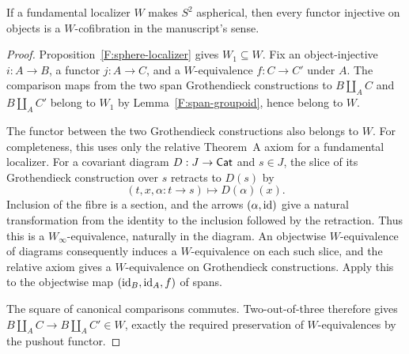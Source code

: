 \begin{theorem}\label{F:sphere-cofibrations}
If a fundamental localizer $W$ makes $S^2$ aspherical, then every
functor injective on objects is a $W$-cofibration in the manuscript's
sense.
\end{theorem}
\begin{proof}
Proposition~\ref{F:sphere-localizer} gives $W_1\subseteq W$.
Fix an object-injective $i:A\to B$, a functor $j:A\to C$, and a
$W$-equivalence $f:C\to C'$ under $A$. The comparison maps from
the two span Grothendieck constructions to
$B\amalg_A C$ and $B\amalg_A C'$ belong to $W_1$ by
Lemma~\ref{F:span-groupoid}, hence belong to $W$.

The functor between the two Grothendieck constructions also belongs
to $W$. For completeness, this uses only the relative Theorem~A
axiom for a fundamental localizer. For a covariant diagram
$D:J\to\mathsf{Cat}$ and $s\in J$, the slice of its Grothendieck construction
over $s$ retracts to $D(s)$ by
\[
 (t,x,\alpha:t\to s)\longmapsto D(\alpha)(x).
\]
Inclusion of the fibre is a section, and the arrows
$(\alpha,\mathrm{id})$ give a natural transformation from the identity to
the inclusion followed by the retraction. Thus this is a
$W_\infty$-equivalence, naturally in the diagram.
An objectwise $W$-equivalence of diagrams consequently induces a
$W$-equivalence on each such slice, and the relative axiom gives
a $W$-equivalence on Grothendieck constructions.
Apply this to the objectwise map $(\mathrm{id}_B,\mathrm{id}_A,f)$ of spans.

The square of canonical comparisons commutes. Two-out-of-three
therefore gives
$B\amalg_A C\to B\amalg_A C'\in W$, exactly the required
preservation of $W$-equivalences by the pushout functor.
\end{proof}

